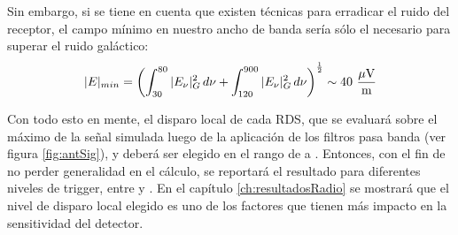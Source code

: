 	Sin embargo, si se tiene en cuenta que existen t\'ecnicas para erradicar el ruido del receptor, el campo m\'inimo en nuestro ancho de banda ser\'ia s\'olo el necesario para superar el ruido gal\'actico:
	\begin{equation}
	|E|_{min}=\left(\int_{30}^{80}|E_\nu|^2_G \,d\nu+
	\int_{120}^{900}|E_\nu|^2_G\, d\nu
	\right)^\frac{1}{2}
	\sim 40 {\rm\ \dfrac{\mu V}{m}}
	\end{equation}
	
	Con todo esto en mente, el disparo local de cada RDS, que se evaluar\'a sobre el m\'aximo de la se\~nal simulada luego de la aplicaci\'on de los filtros pasa banda (ver figura \ref{fig:antSig}), y deber\'a ser elegido en el rango de  a .
	Entonces, con el fin de no perder generalidad en el c\'alculo, se reportar\'a el resultado para diferentes niveles de trigger, entre  y .
	En el cap\'itulo \ref{ch:resultadosRadio} se mostrar\'a que el nivel de disparo local elegido es uno de los factores que tienen m\'as impacto en la sensitividad del detector.
	

